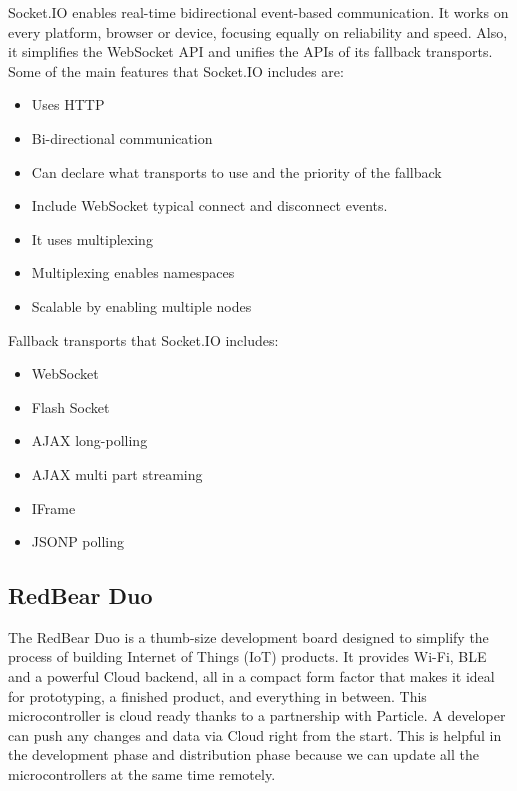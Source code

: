 \documentclass[12pt]{article}
\begin{document}
Socket.IO enables real-time bidirectional event-based communication\cite{Rauch2014}. It works on every platform, browser or device, focusing equally on reliability and speed. Also, it simplifies the WebSocket API and unifies the APIs of its fallback transports. Some of the main features that Socket.IO includes are:

\begin{itemize}
  \item Uses HTTP
  \item Bi-directional communication
  \item Can declare what transports to use and the priority of the fallback
  \item Include WebSocket typical connect and disconnect events.
  \item It uses multiplexing
  \item Multiplexing enables namespaces
  \item Scalable by enabling multiple nodes
\end{itemize}


Fallback transports that Socket.IO includes\cite{Kelleher2014}:

\begin{itemize}
  \item WebSocket
  \item Flash Socket
  \item AJAX long-polling
  \item AJAX multi part streaming
  \item IFrame
  \item JSONP polling
\end{itemize}

\subsection{RedBear Duo}

The RedBear Duo is a thumb-size development board designed to simplify the process of building Internet of Things (IoT) products. It provides Wi-Fi, BLE and a powerful Cloud backend, all in a compact form factor that makes it ideal for prototyping, a finished product, and everything in between\cite{Labs2016}. This microcontroller is cloud ready thanks to a partnership with Particle. A developer can push any changes and data via Cloud right from the start. This is helpful in the development phase and distribution phase because we can update all the microcontrollers at the same time remotely.
\end{document}
